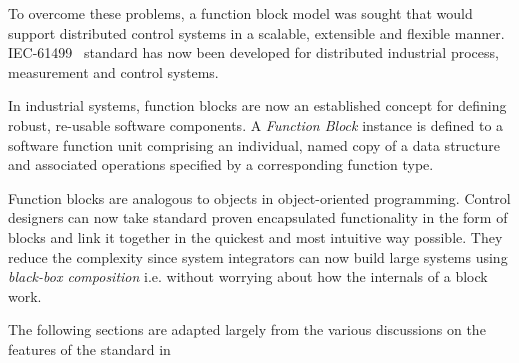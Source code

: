 To overcome these problems, a function block model was sought that
would support distributed control systems in a scalable,
extensible and flexible manner. IEC-61499~\cite{IEC-61499}
standard has now been developed for distributed industrial
process, measurement and control systems.

In industrial systems, function blocks are now an established
concept for defining robust, re-usable software components. A {\it
Function Block} instance is defined to a software function unit
comprising an individual, named copy of a data structure and
associated operations specified by a corresponding function type.

Function blocks are analogous to objects in object-oriented
programming. Control designers can now take standard proven
encapsulated functionality in the form of blocks and link it
together in the quickest and most intuitive way possible. They
reduce the complexity since system integrators can now build large
systems using {\it black-box composition} i.e. without worrying
about how the internals of a block work.

The following sections are adapted largely from the various
discussions on the features of the standard in ~\cite{IEC-61499,
IEC-61131-3, Book-61131, Book-61499, christensen1, christensen2}

